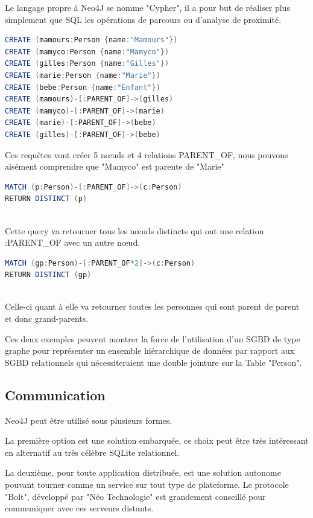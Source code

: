 \documentclass[a4paper,fleqn,12pt]{report}
\begin{document}
Le langage propre à Neo4J se nomme "Cypher"\label{Cypher}, il a pour but de réaliser plus simplement que SQL les opérations de parcours ou d'analyse de proximité.

\begin{lstlisting}[language=java, frame=single]
CREATE (mamours:Person {name:"Mamours"})
CREATE (mamyco:Person {name:"Mamyco"})
CREATE (gilles:Person {name:"Gilles"})
CREATE (marie:Person {name:"Marie"})
CREATE (bebe:Person {name:"Enfant"})
CREATE (mamours)-[:PARENT_OF]->(gilles)
CREATE (mamyco)-[:PARENT_OF]->(marie)
CREATE (marie)-[:PARENT_OF]->(bebe)
CREATE (gilles)-[:PARENT_OF]->(bebe)
\end{lstlisting}

Ces requêtes vont créer 5 nœuds et 4 relations PARENT\_OF, nous pouvons aisément comprendre que "Mamyco" est parente de "Marie"

\begin{lstlisting}[language=java, frame=single]
MATCH (p:Person)-[:PARENT_OF]->(c:Person) 
RETURN DISTINCT (p)
	
\end{lstlisting}

Cette query va retourner tous les nœuds distincts qui ont une relation :PARENT\_OF avec un autre nœud.

\begin{lstlisting}[language=java, frame=single]
MATCH (gp:Person)-[:PARENT_OF*2]->(c:Person) 
RETURN DISTINCT (gp)
	
\end{lstlisting}

Celle-ci quant à elle va retourner toutes les personnes qui sont parent de parent et donc grand-parents. 

Ces deux exemples peuvent montrer la force de l’utilisation d’un SGBD de type graphe pour représenter un ensemble hiérarchique de données par rapport aux SGBD relationnels qui nécessiteraient une double jointure sur la Table "Person".

\subsection{Communication}

Neo4J peut être utilisé sous plusieurs formes.

La première option est une solution embarquée, ce choix peut être très intéressant en alternatif au très célèbre SQLite relationnel.

La deuxième, pour toute application distribuée, est une solution autonome pouvant tourner comme un service sur tout type de plateforme. Le protocole "Bolt", développé par "Néo Technologie" est grandement conseillé pour communiquer avec ces serveurs distants.
\end{document}
